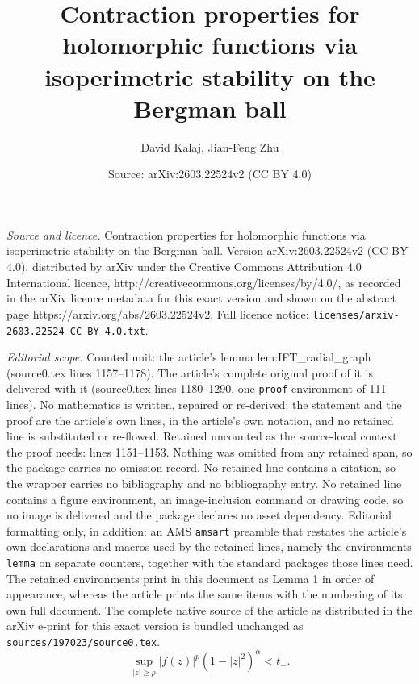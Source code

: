 \documentclass[10pt,a4paper]{amsart}
\title{Contraction properties for holomorphic functions via isoperimetric stability on the Bergman ball}
\author{David Kalaj, Jian-Feng Zhu}
\date{Source: arXiv:2603.22524v2 (CC BY 4.0)}
\begin{document}
\maketitle

\noindent\emph{Source and licence.} Contraction properties for holomorphic functions via isoperimetric stability on the Bergman ball. Version arXiv:2603.22524v2 (CC BY 4.0), distributed by arXiv under the Creative Commons Attribution 4.0 International licence, http://creativecommons.org/licenses/by/4.0/, as recorded in the arXiv licence metadata for this exact version and shown on the abstract page https://arxiv.org/abs/2603.22524v2. Full licence notice: \texttt{licenses/arxiv-2603.22524-CC-BY-4.0.txt}.\par\smallskip

\noindent\textit{Editorial scope.} Counted unit: the article's lemma lem:IFT\_radial\_graph (source0.tex lines 1157--1178). The article's complete original proof of it is delivered with it (source0.tex lines 1180--1290, one \texttt{proof} environment of 111 lines). No mathematics is written, repaired or re-derived: the statement and the proof are the article's own lines, in the article's own notation, and no retained line is substituted or re-flowed.  Retained uncounted as the source-local context the proof needs: lines 1151--1153.  Nothing was omitted from any retained span, so the package carries no omission record.  No retained line contains a citation, so the wrapper carries no bibliography and no bibliography entry.  No retained line contains a figure environment, an image-inclusion command or drawing code, so no image is delivered and the package declares no asset dependency.  Editorial formatting only, in addition: an AMS \texttt{amsart} preamble that restates the article's own declarations and macros used by the retained lines, namely the environments \texttt{lemma} on separate counters, together with the standard packages those lines need.  The retained environments print in this document as Lemma 1 in order of appearance, whereas the article prints the same items with the numbering of its own full document.  The complete native source of the article as distributed in the arXiv e-print for this exact version is bundled unchanged as \texttt{sources/197023/source0.tex}.
\begin{equation}\label{eq:tail_condition}
\sup_{|z|\ge\rho}|f(z)|^p(1-|z|^2)^\alpha<t_-.
\end{equation}
\end{document}
